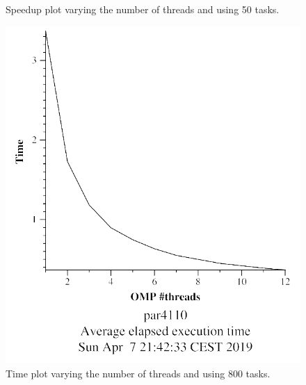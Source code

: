\documentclass[12pt, a4paper]{article}
\begin{document}
\begin{figure}[H]
\begin{minipage}[t]{0.48\linewidth}
  \caption{Speedup plot varying the number of threads and using 50 tasks.}
  \label{fig:mandel-omp-10000-strong-omp-24-50-speedup}
\end{minipage}
\end{figure}

\begin{figure}[H]
\begin{minipage}[t]{0.48\linewidth}
  \centering
  \includegraphics[scale=0.5]{./mandel-omp-10000-strong-omp-24-800-time}
  \caption{Time plot varying the number of threads and using 800 tasks.}
  \label{fig:mandel-omp-10000-strong-omp-24-800-time}
\end{minipage}%
\hspace{0.5cm}
\begin{minipage}[t]{0.48\linewidth}
  \centering

\end{minipage}
\end{figure}
\end{document}
